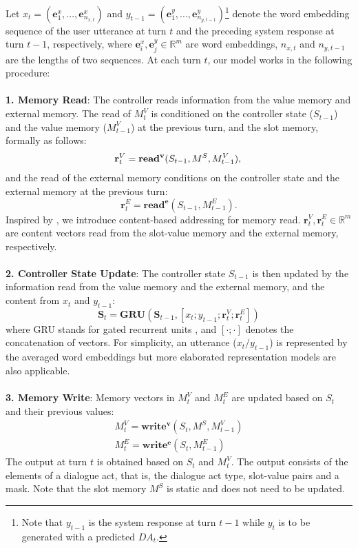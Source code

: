 Let $x_t=(\mathbf{e}_1^x,...,\mathbf{e}_{n_{x,t}}^x)$ and $y_{t-1}=(\mathbf{e}_1^y,...,\mathbf{e}_{n_{y,t-1}}^y)$\footnote{Note that $y_{t-1}$ is the system response at turn $t-1$ while $y_t$ is to be generated with a predicted $DA_t$.} denote the word embedding sequence of the user utterance at turn $t$ and the preceding system response at turn $t-1$, respectively, where $\mathbf{e}_i^x,\mathbf{e}_j^y\in\mathbb{R}^m$ are word embeddings, $n_{x,t}$ and $n_{y,t-1}$ are the lengths of two sequences. At each turn $t$, our model works in the following procedure:
\\
\\{\bf 1. Memory Read}:
The controller reads information from the value memory and external memory. The read of $M_t^V$ is conditioned on the controller state ($S_{t-1}$) and the value memory ($M_{t-1}^V$) at the previous turn, and the slot memory, formally as follows:
\begin{equation}
    \mathbf{r}_t^{V}= \mathbf{read^v}(S_{t-1}, M^S, M_{t-1}^V),\\
\end{equation}
and the read of the external memory conditions on the controller state and the external memory at the previous turn:
\begin{equation}
    \mathbf{r}_t^E= \mathbf{read^e}(S_{t-1}, M_{t-1}^E).
\end{equation}
Inspired by \cite{graves2014neural}, we introduce content-based addressing for memory read. $\mathbf{r}_t^{V},\mathbf{r}_t^E\in\mathbb{R}^m$ are content vectors read from the slot-value memory and the external memory, respectively.
\\
\\{\bf 2. Controller State Update}:
The controller state $S_{t-1}$ is then updated by the information read from the value memory and the external memory, and the content from $x_t$ and $y_{t-1}$:
\begin{equation}
    \mathbf{S}_t=\mathbf{GRU}(\mathbf{S}_{t-1}, [x_t;y_{t-1}; \mathbf{r}_t^V; \mathbf{r}_t^E])
\end{equation}
where GRU stands for gated recurrent units \cite{cho2014learning}, and $[\cdot;\cdot]$ denotes the concatenation of vectors. 
For simplicity, an utterance ($x_t/y_{t-1}$) is represented by the averaged word embeddings but more elaborated representation models are also applicable.
\\
\\{\bf 3. Memory Write}:
Memory vectors in $M_{t}^V$ and $M_{t}^E$ are updated based on $S_t$ and their previous values:
\begin{gather}
    M_t^V=\mathbf{write^v}(S_t, M^S, M_{t-1}^V)\\
    M_t^E=\mathbf{write^e}(S_t, M_{t-1}^E)
\end{gather}
The output at turn $t$ is obtained  based on $S_t$ and $M_t^V$. The output consists of the elements of a dialogue act, that is, the dialogue act type, slot-value pairs and a mask. Note that the slot memory $M^S$ is static and does not need to be updated.

